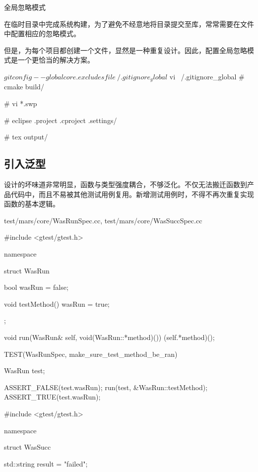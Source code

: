 \begin{content}
\begin{episode}{全局忽略模式}
\begin{content}

在临时目录中完成系统构建，为了避免不经意地将目录提交至库，常常需要在文件中配置相应的忽略模式。

但是，为每个项目都创建一个文件，显然是一种重复设计。因此，配置全局忽略模式是一个更恰当的解决方案。

 \begin{c++}
$ git config --global core.excludesfile ~/.gitignore_global
$ vi ~/.gitignore_global
# cmake
build/

# vi
*.swp

# eclipse
.project
.cproject
.settings/

# tex
output/
 \end{c++}

\end{content}
\end{episode}

\subsection{引入泛型}

设计的坏味道非常明显，函数与类型强度耦合，不够泛化。不仅无法搬迁函数到产品代码中，而且不易被其他测试用例复用。新增测试用例时，不得不再次重复实现函数的基本逻辑。

\begin{diff}{test/mars/core/WasRunSpec.cc, test/mars/core/WasSuccSpec.cc}
\begin{minicpp}
#include <gtest/gtest.h>

namespace {
  struct WasRun {
    bool wasRun = false;

    void testMethod() {
      wasRun = true;
    }
  };
  
  void run(WasRun& self, void(WasRun::*method)()) {
    (self.*method)();
  }
}

TEST(WasRunSpec, make_sure_test_method_be_ran) {
  WasRun test;

  ASSERT_FALSE(test.wasRun);
  run(test, &WasRun::testMethod);
  ASSERT_TRUE(test.wasRun);
}
\end{minicpp}
\tcblower
\begin{minicpp}
#include <gtest/gtest.h>

namespace {
  struct WasSucc {
    std::string result = "failed";

}}
\end{minicpp}
\end{diff}
\end{content}
